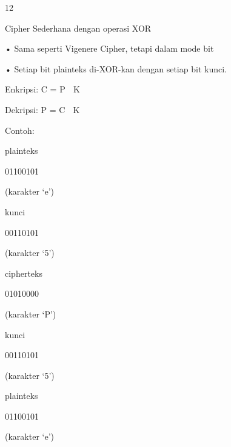 \documentclass{article}
\begin{document}

12

Cipher Sederhana dengan operasi XOR

• Sama seperti Vigenere Cipher, tetapi dalam mode bit

• Setiap bit plainteks di-XOR-kan dengan setiap bit kunci.


Enkripsi: C =  P  K 


Dekripsi: P = C  K  


Contoh: 

plainteks 


01100101  

(karakter ‘e’) 



kunci  


00110101  

(karakter ‘5’) 




cipherteks  

01010000  

(karakter ‘P’) 



kunci  


00110101  

(karakter ‘5’) 




plainteks 


01100101  

(karakter ‘e’)
\end{document}
